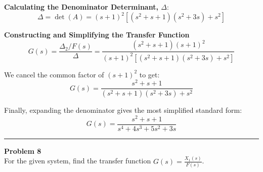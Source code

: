 \documentclass[11pt]{article}
\begin{document}
\noindent\textbf{Calculating the Denominator Determinant, $\Delta$}:
$$\Delta = \det(A) = (s+1)^2 \left[ (s^2+s+1)(s^2+3s) + s^2 \right]$$

\vspace{12pt}
\noindent\textbf{Constructing and Simplifying the Transfer Function}
$$G(s) = \frac{\Delta_2 / F(s)}{\Delta} = \frac{(s^2+s+1)(s+1)^2}{(s+1)^2 \left[ (s^2+s+1)(s^2+3s) + s^2 \right]}$$

We cancel the common factor of $(s+1)^2$ to get:
$$G(s) = \frac{s^2+s+1}{(s^2+s+1)(s^2+3s) + s^2}$$

Finally, expanding the denominator gives the most simplified standard form:
\[
\boxed{
G(s) = \frac{s^2+s+1}{s^4 + 4s^3 + 5s^2 + 3s}
}
\]



\newpage
  \setcounter{page}{14}  
\noindent\rule{\textwidth}{1pt}
\noindent\textbf{Problem 8} \hfill 
\\ For the given system, find the transfer function $G(s)=\frac{X_1(s)}{F(s)}$.
\end{document}
